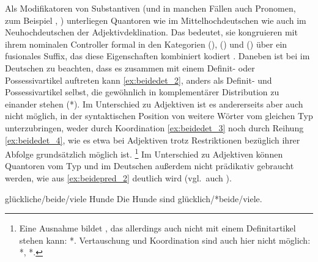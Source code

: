 Als Modifikatoren von Substantiven (und in manchen Fällen auch Pronomen, zum
Beispiel , ) unterliegen Quantoren wie
 im Mittelhochdeutschen wie auch  im Neuhochdeutschen
der Adjektivdeklination. Das bedeutet, sie kongruieren mit ihrem nominalen
Controller formal in den Kategorien  (\Case),
 (\Gend) und  (\Num) über ein
fusionales Suffix, das diese Eigenschaften kombiniert kodiert
\autocites(vgl.~auch
\cref{sec:ctrltarg,sec:lfgkongr})[181--184]{ksw2}[368--369]{woellstein2016}.
Daneben ist bei  im Deutschen zu beachten, dass es zusammen mit einem
Definit- oder Possessivartikel auftreten kann \cref{ex:beidedet_2}, anders als
Definit- und Possessivartikel selbst, die gewöhnlich in komplementärer
Distribution zu einander stehen (*). Im Unterschied zu
Adjektiven ist es andererseits aber auch nicht möglich, in der syntaktischen
Position von  weitere Wörter vom gleichen Typ unterzubringen, weder
durch Koordination \cref{ex:beidedet_3} noch durch Reihung
\cref{ex:beidedet_4}, wie es etwa bei Adjektiven trotz Restriktionen
bezüglich ihrer Abfolge grundsätzlich möglich ist.%
%
	\footnote{Eine Ausnahme bildet , das allerdings auch nicht
		mit einem Definitartikel stehen kann: *.
		Vertauschung und Koordination sind auch hier nicht möglich: *, *.%
	}
%
Im Unterschied zu Adjektiven können Quantoren vom Typ  und 
im Deutschen außerdem nicht prädikativ gebraucht werden, wie aus
\cref{ex:beidepred_2} deutlich wird (vgl.~auch \cite[181,
Anm.~1]{merchant1996}).

\begin{exe}
\label{ex:beidedet}
\ex \begin{xlist}
		\label{ex:beidedet_1}
		\label{ex:beidedet_2}
		\label{ex:beidedet_3}
		\label{ex:beidedet_4}
\end{xlist}

\ex \begin{xlist}
	\ex glückliche/beide/viele Hunde
		\label{ex:beidepred_1}
	\ex Die Hunde sind glücklich/*beide/viele.
		\label{ex:beidepred_2}
\end{xlist}
\end{exe}

